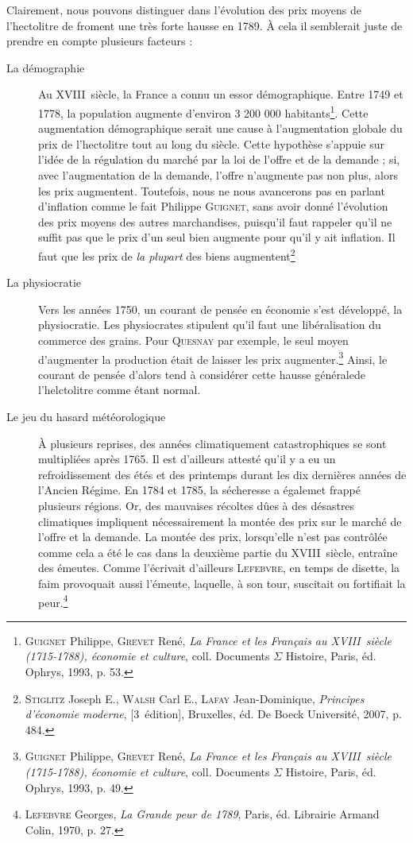 \documentclass[a4paper,11pt,]{scrartcl}
\begin{document}
Clairement, nous pouvons distinguer dans l'évolution des prix moyens de l'hectolitre de froment une très forte hausse en 1789. À cela il semblerait juste de prendre en compte plusieurs facteurs :
\begin{description}
 \item[La démographie] Au XVIII\ieme~siècle, la France a connu un essor démographique. Entre 1749 et 1778, la population augmente d'environ 3 200 000 habitants\footnote{\textsc{Guignet} Philippe, \textsc{Grevet} René, \emph{La France et les Français au XVIII\ieme~siècle (1715-1788), économie et culture}, coll. \og Documents $\Sigma$ Histoire\fg, Paris, éd. Ophrys, 1993, p. 53.}. Cette augmentation démographique serait une cause à l'augmentation globale du prix de l'hectolitre tout au long du siècle. Cette hypothèse s'appuie sur l'idée de la régulation du marché par la loi de l'offre et de la demande ; si, avec l'augmentation de la demande, l'offre n'augmente pas non plus, alors les prix augmentent. Toutefois, nous ne nous avancerons pas en parlant d'inflation comme le fait Philippe \textsc{Guignet}, sans avoir donné l'évolution des prix moyens des autres marchandises, puisqu'il faut rappeler qu'\og il ne suffit pas que le prix d'un seul bien augmente pour qu'il y ait inflation. Il faut que les prix de \emph{la plupart} des biens augmentent\fg\footnote{\textsc{Stiglitz} Joseph E., \textsc{Walsh} Carl E., \textsc{Lafay} Jean-Dominique, \emph{Principes d'économie moderne}, [3\ieme~édition], Bruxelles, éd. De Boeck Université, 2007, p. 484.}
 \item[La physiocratie] Vers les années 1750, un courant de pensée en économie s'est développé, la physiocratie. Les physiocrates stipulent qu'il faut une libéralisation du commerce des grains. Pour \textsc{Quesnay} par exemple, le seul moyen d'augmenter la production était de laisser les prix augmenter.\footnote{\textsc{Guignet} Philippe, \textsc{Grevet} René,
  \emph{La France et les Français au XVIII\ieme~siècle (1715-1788), économie
et culture}, coll. \og Documents $\Sigma$ Histoire\fg, Paris, éd. Ophrys, 1993, p. 49.} Ainsi, le courant de pensée d'alors tend à considérer cette hausse généralede l'helctolitre comme étant normal.
 \item[Le \og jeu du hasard météorologique\fg] À plusieurs reprises, des années climatiquement catastrophiques se sont multipliées après 1765. Il est d'ailleurs attesté qu'il y a eu un refroidissement des étés et des printemps durant les dix dernières années de l'Ancien Régime. En 1784 et 1785, la sécheresse a égalemet frappé plusieurs régions. Or, des mauvaises récoltes dûes à des désastres climatiques impliquent nécessairement la montée des prix sur le marché de l'offre et la demande. La montée des prix, lorsqu'elle n'est pas contrôlée comme cela a été le cas dans la deuxième partie du XVIII\ieme~siècle, entraîne des émeutes. Comme l'écrivait d'ailleurs \textsc{Lefebvre}, \og en temps de disette, la faim provoquait aussi l'émeute, laquelle, à son tour, suscitait ou fortifiait la peur.\fg\footnote{\textsc{Lefebvre} Georges, \emph{La Grande peur de 1789}, Paris, éd. Librairie Armand Colin, 1970, p. 27.}
\end{description}
\end{document}
